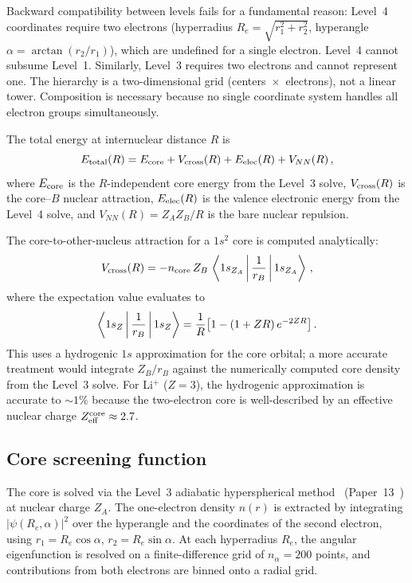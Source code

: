 \documentclass[aps,pra,twocolumn,superscriptaddress,longbibliography,floatfix]{revtex4-2}
\begin{document}
Backward compatibility between levels fails for a fundamental reason:
Level~4 coordinates require two electrons (hyperradius
$R_e = \sqrt{r_1^2 + r_2^2}$, hyperangle $\alpha = \arctan(r_2/r_1)$),
which are undefined for a single electron.  Level~4 cannot subsume
Level~1.  Similarly, Level~3 requires two electrons and cannot
represent one.  The hierarchy is a two-dimensional grid
(centers~$\times$~electrons), not a linear tower.  Composition is
necessary because no single coordinate system handles all electron
groups simultaneously.

The total energy at internuclear distance $R$ is
\begin{equation}
  E_{\rm total}(R) = E_{\rm core} + V_{\rm cross}(R)
    + E_{\rm elec}(R) + V_{NN}(R)\,,
  \label{eq:Etotal}
\end{equation}
where $E_{\rm core}$ is the $R$-independent core energy from the
Level~3 solve, $V_{\rm cross}(R)$ is the core--$B$ nuclear attraction,
$E_{\rm elec}(R)$ is the valence electronic energy from the Level~4
solve, and $V_{NN}(R) = Z_A Z_B / R$ is the bare nuclear repulsion.

The core-to-other-nucleus attraction for a $1s^2$ core is computed
analytically:
\begin{equation}
  V_{\rm cross}(R) = -n_{\rm core}\, Z_B\,
    \Braket{1s_{Z_A} | \frac{1}{r_B} | 1s_{Z_A}}\,,
  \label{eq:Vcross}
\end{equation}
where the expectation value evaluates to
\begin{equation}
  \Braket{1s_Z | \frac{1}{r_B} | 1s_Z}
    = \frac{1}{R}\bigl[1 - (1 + ZR)\,e^{-2ZR}\bigr]\,.
  \label{eq:1s_expectation}
\end{equation}
This uses a hydrogenic $1s$ approximation for the core orbital; a more
accurate treatment would integrate $Z_B/r_B$ against the numerically
computed core density from the Level~3 solve.  For Li$^+$ ($Z=3$),
the hydrogenic approximation is accurate to ${\sim}1\%$ because the
two-electron core is well-described by an effective nuclear charge
$Z_{\rm eff}^{\rm core} \approx 2.7$.


\subsection{Core screening function}
\label{sec:screening}

The core is solved via the Level~3 adiabatic hyperspherical
method~\cite{lin1995} (Paper~13~\cite{paper13}) at nuclear charge $Z_A$.  The one-electron
density $n(r)$ is extracted by integrating $|\psi(R_e, \alpha)|^2$
over the hyperangle and the coordinates of the second electron,
using $r_1 = R_e \cos\alpha$, $r_2 = R_e \sin\alpha$.
At each hyperradius $R_e$, the angular eigenfunction is resolved on a
finite-difference grid of $n_\alpha = 200$ points, and contributions
from both electrons are binned onto a radial grid.
\end{document}
